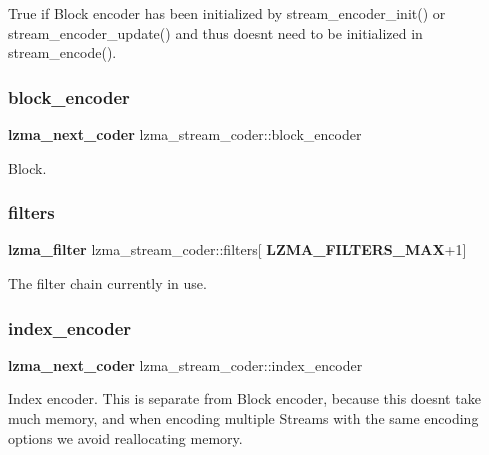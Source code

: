 True if Block encoder has been initialized by stream\+\_\+encoder\+\_\+init() or stream\+\_\+encoder\+\_\+update() and thus doesn\textquotesingle{}t need to be initialized in stream\+\_\+encode(). \mbox{\label{structlzma__stream__coder_ae8eced7d6fcd4dc8a63d11ae89e12b22}} 
\subsubsection{block\+\_\+encoder}
{\footnotesize\ttfamily \textbf{ lzma\+\_\+next\+\_\+coder} lzma\+\_\+stream\+\_\+coder\+::block\+\_\+encoder}



Block. 

\mbox{\label{structlzma__stream__coder_ad1dd14a4936d2ac70c5f342ce8a7d5e5}} 
\subsubsection{filters}
{\footnotesize\ttfamily \textbf{ lzma\+\_\+filter} lzma\+\_\+stream\+\_\+coder\+::filters[\textbf{ L\+Z\+M\+A\+\_\+\+F\+I\+L\+T\+E\+R\+S\+\_\+\+M\+AX}+1]}



The filter chain currently in use. 

\mbox{\label{structlzma__stream__coder_a19893929521ece9318b515a40ad8384e}} 
\subsubsection{index\+\_\+encoder}
{\footnotesize\ttfamily \textbf{ lzma\+\_\+next\+\_\+coder} lzma\+\_\+stream\+\_\+coder\+::index\+\_\+encoder}

Index encoder. This is separate from Block encoder, because this doesn\textquotesingle{}t take much memory, and when encoding multiple Streams with the same encoding options we avoid reallocating memory. \mbox{\label{structlzma__stream__coder_a460a12a2f6bdb26d1d7a95b610087a5d}} 
